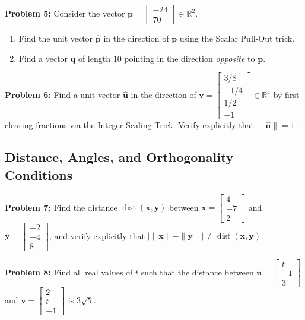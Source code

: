 \documentclass[11pt, letterpaper]{article}
\theoremstyle{definition}
\theoremstyle{remark}
\begin{document}
\textbf{Problem 5:} Consider the vector $\mathbf{p} = \begin{bmatrix} -24 \\ 70 \end{bmatrix} \in \mathbb{R}^2$.
\begin{enumerate}[label=(\alph*)]
    \item Find the unit vector $\hat{\mathbf{p}}$ in the direction of $\mathbf{p}$ using the Scalar Pull-Out trick.
    \item Find a vector $\mathbf{q}$ of length $10$ pointing in the direction \emph{opposite} to $\mathbf{p}$.
\end{enumerate}

\textbf{Problem 6:} Find a unit vector $\hat{\mathbf{u}}$ in the direction of $\mathbf{v} = \begin{bmatrix} 3/8 \\ -1/4 \\ 1/2 \\ -1 \end{bmatrix} \in \mathbb{R}^4$ by first clearing fractions via the Integer Scaling Trick. Verify explicitly that $\|\hat{\mathbf{u}}\| = 1$.

\subsection{Distance, Angles, and Orthogonality Conditions}

\textbf{Problem 7:} Find the distance $\operatorname{dist}(\mathbf{x}, \mathbf{y})$ between $\mathbf{x} = \begin{bmatrix} 4 \\ -7 \\ 2 \end{bmatrix}$ and $\mathbf{y} = \begin{bmatrix} -2 \\ -4 \\ 8 \end{bmatrix}$, and verify explicitly that $|\|\mathbf{x}\| - \|\mathbf{y}\|| \neq \operatorname{dist}(\mathbf{x}, \mathbf{y})$.

\textbf{Problem 8:} Find all real values of $t$ such that the distance between $\mathbf{u} = \begin{bmatrix} t \\ -1 \\ 3 \end{bmatrix}$ and $\mathbf{v} = \begin{bmatrix} 2 \\ t \\ -1 \end{bmatrix}$ is $3\sqrt{5}$.
\end{document}

